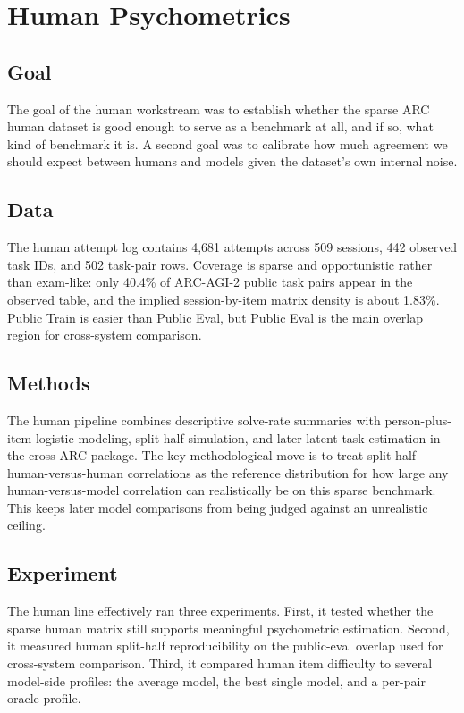 \documentclass[11pt,letterpaper]{article}
\begin{document}
\section{Human Psychometrics}

\subsection{Goal}

The goal of the human workstream was to establish whether the sparse ARC human dataset is good enough to serve as a benchmark at all, and if so, what kind of benchmark it is. A second goal was to calibrate how much agreement we should expect between humans and models given the dataset's own internal noise.

\subsection{Data}

The human attempt log contains 4,681 attempts across 509 sessions, 442 observed task IDs, and 502 task-pair rows. Coverage is sparse and opportunistic rather than exam-like: only 40.4\% of ARC-AGI-2 public task pairs appear in the observed table, and the implied session-by-item matrix density is about 1.83\%. Public Train is easier than Public Eval, but Public Eval is the main overlap region for cross-system comparison.

\subsection{Methods}

The human pipeline combines descriptive solve-rate summaries with person-plus-item logistic modeling, split-half simulation, and later latent task estimation in the cross-ARC package. The key methodological move is to treat split-half human-versus-human correlations as the reference distribution for how large any human-versus-model correlation can realistically be on this sparse benchmark. This keeps later model comparisons from being judged against an unrealistic ceiling.

\subsection{Experiment}

The human line effectively ran three experiments. First, it tested whether the sparse human matrix still supports meaningful psychometric estimation. Second, it measured human split-half reproducibility on the public-eval overlap used for cross-system comparison. Third, it compared human item difficulty to several model-side profiles: the average model, the best single model, and a per-pair oracle profile.
\end{document}
